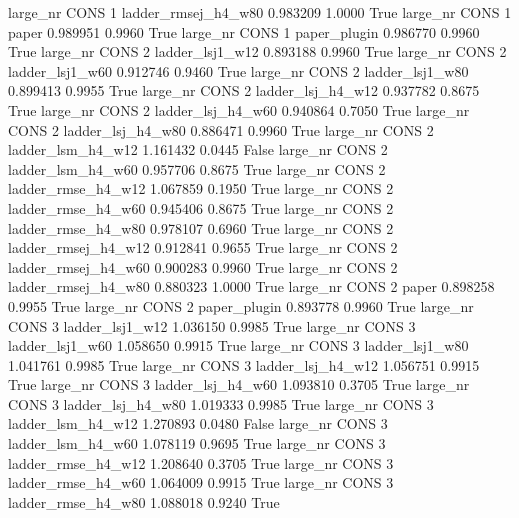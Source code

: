   large_nr     CONS                 1 ladder_rmsej_h4_w80   0.983209      1.0000    True
  large_nr     CONS                 1               paper   0.989951      0.9960    True
  large_nr     CONS                 1        paper_plugin   0.986770      0.9960    True
  large_nr     CONS                 2     ladder_lsj1_w12   0.893188      0.9960    True
  large_nr     CONS                 2     ladder_lsj1_w60   0.912746      0.9460    True
  large_nr     CONS                 2     ladder_lsj1_w80   0.899413      0.9955    True
  large_nr     CONS                 2   ladder_lsj_h4_w12   0.937782      0.8675    True
  large_nr     CONS                 2   ladder_lsj_h4_w60   0.940864      0.7050    True
  large_nr     CONS                 2   ladder_lsj_h4_w80   0.886471      0.9960    True
  large_nr     CONS                 2   ladder_lsm_h4_w12   1.161432      0.0445   False
  large_nr     CONS                 2   ladder_lsm_h4_w60   0.957706      0.8675    True
  large_nr     CONS                 2  ladder_rmse_h4_w12   1.067859      0.1950    True
  large_nr     CONS                 2  ladder_rmse_h4_w60   0.945406      0.8675    True
  large_nr     CONS                 2  ladder_rmse_h4_w80   0.978107      0.6960    True
  large_nr     CONS                 2 ladder_rmsej_h4_w12   0.912841      0.9655    True
  large_nr     CONS                 2 ladder_rmsej_h4_w60   0.900283      0.9960    True
  large_nr     CONS                 2 ladder_rmsej_h4_w80   0.880323      1.0000    True
  large_nr     CONS                 2               paper   0.898258      0.9955    True
  large_nr     CONS                 2        paper_plugin   0.893778      0.9960    True
  large_nr     CONS                 3     ladder_lsj1_w12   1.036150      0.9985    True
  large_nr     CONS                 3     ladder_lsj1_w60   1.058650      0.9915    True
  large_nr     CONS                 3     ladder_lsj1_w80   1.041761      0.9985    True
  large_nr     CONS                 3   ladder_lsj_h4_w12   1.056751      0.9915    True
  large_nr     CONS                 3   ladder_lsj_h4_w60   1.093810      0.3705    True
  large_nr     CONS                 3   ladder_lsj_h4_w80   1.019333      0.9985    True
  large_nr     CONS                 3   ladder_lsm_h4_w12   1.270893      0.0480   False
  large_nr     CONS                 3   ladder_lsm_h4_w60   1.078119      0.9695    True
  large_nr     CONS                 3  ladder_rmse_h4_w12   1.208640      0.3705    True
  large_nr     CONS                 3  ladder_rmse_h4_w60   1.064009      0.9915    True
  large_nr     CONS                 3  ladder_rmse_h4_w80   1.088018      0.9240    True
